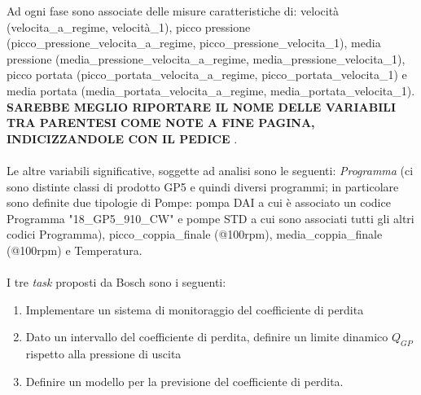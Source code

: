 \documentclass[fleqn,10pt]{SelfArx} %
\begin{document}
Ad ogni fase sono associate delle misure caratteristiche di: velocità (velocita\_a\_regime, velocità\_1), picco pressione (picco\_pressione\_velocita\_a\_regime, picco\_pressione\_velocita\_1), media pressione (media\_pressione\_velocita\_a\_regime, media\_pressione\_velocita\_1), picco portata (picco\_portata\_velocita\_a\_regime, picco\_portata\_velocita\_1) e media portata (media\_portata\_velocita\_a\_regime, media\_portata\_velocita\_1).\\
\textbf{SAREBBE MEGLIO RIPORTARE IL NOME DELLE VARIABILI TRA PARENTESI COME NOTE A FINE PAGINA, INDICIZZANDOLE CON IL PEDICE }.\\
\\
Le altre variabili significative, soggette ad analisi sono le seguenti: \textit{Programma} (ci sono distinte classi di prodotto GP5 e quindi diversi programmi; in particolare sono definite due tipologie di Pompe: pompa DAI a cui è associato un codice Programma "18\_GP5\_910\_CW" e pompe STD a cui sono associati tutti gli altri codici Programma), picco\_coppia\_finale (@100rpm), media\_coppia\_finale (@100rpm) e Temperatura.\\
\\
I tre \textit{task} proposti da Bosch sono i seguenti:
\begin{enumerate}
    \item Implementare un sistema di monitoraggio del coefficiente di perdita
    \item Dato un intervallo del coefficiente di perdita, definire un limite dinamico $Q_{GP}$ rispetto alla pressione di uscita
    \item Definire un modello per la previsione del coefficiente di perdita.
\end{enumerate}
\end{document}
